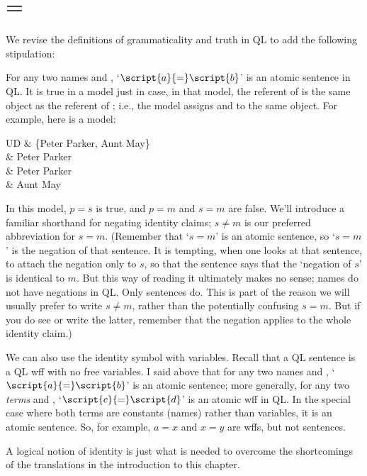\section{=}

We revise the definitions of grammaticality and truth in QL to add the following stipulation:

For any two names  and , `$\script{a}{=}\script{b}$' is an atomic sentence in QL. It is true in a model just in case, in that model, the referent of  is the same object as the referent of ; i.e., the model assigns  and  to the same object. For example, here is a model:

\begin{partialmodel}
	UD & \{Peter Parker, Aunt May\}\\
	 & Peter Parker\\
	 & Peter Parker\\
	 & Aunt May
\end{partialmodel}

In this model, $p{=}s$ is true, and $p{=}m$ and $s{=}m$ are false. We'll introduce a familiar shorthand for negating identity claims; $s {\neq} m$ is our preferred abbreviation for \enot $s{=}m$. (Remember that `$s{=}m$' is an atomic sentence, so `\enot $s {=} m$' is the negation of that sentence. It is tempting, when one looks at that sentence, to attach the negation only to $s$, so that the sentence says that the `negation of $s$' is identical to $m$. But this way of reading it ultimately makes no sense; names do not have negations in QL. Only sentences do. This is part of the reason we will usually prefer to write $s {\neq} m$, rather than the potentially confusing \enot $s{=}m$. But if you do see or write the latter, remember that the negation applies to the whole identity claim.)

We can also use the identity symbol with variables. Recall that a QL sentence is a QL wff with no free variables. I said above that for any two names  and , `$\script{a}{=}\script{b}$' is an atomic sentence; more generally, for any two \emph{terms}  and , `$\script{c}{=}\script{d}$' is an atomic wff in QL. In the special case where both terms are constants (names) rather than variables, it is an atomic sentence. So, for example,  $a{=}x$ and  $x{=}y$ are wffs, but not sentences.

A logical notion of identity is just what is needed to overcome the shortcomings of the translations in the introduction to this chapter.


